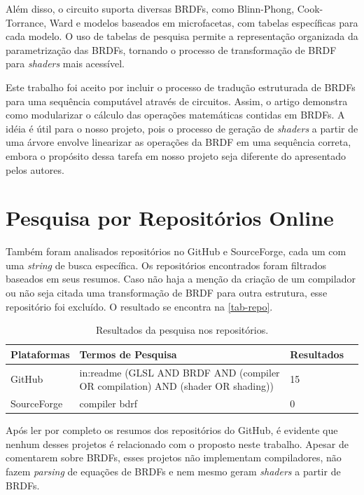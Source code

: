 Além disso, o circuito suporta diversas BRDFs, como Blinn-Phong, Cook-Torrance, Ward e modelos baseados em microfacetas, com tabelas específicas para cada modelo. O uso de tabelas de pesquisa permite a representação organizada da parametrização das BRDFs, tornando o processo de transformação de BRDF para \textit{shaders} mais acessível.

Este trabalho foi aceito por incluir o processo de tradução estruturada de BRDFs para uma sequência computável através de circuitos. Assim, o artigo demonstra como modularizar o cálculo das operações matemáticas contidas em BRDFs. A idéia é útil para o nosso projeto, pois o processo de geração de \textit{shaders} a partir de uma árvore envolve linearizar as operações da BRDF em uma sequência correta, embora o propósito dessa tarefa em nosso projeto seja diferente do apresentado pelos autores.


\section{Pesquisa por Repositórios Online}
Também foram analisados repositórios no GitHub e SourceForge, cada um com uma \textit{string} de busca específica. Os repositórios encontrados foram filtrados baseados em seus resumos. Caso não haja a menção da criação de um compilador ou não seja citada uma transformação de BRDF para outra estrutura, esse repositório foi excluído. O resultado se encontra na \autoref{tab-repo}.






\begin{table}[H]
\ABNTEXfontereduzida
\caption{\small Resultados da pesquisa nos repositórios.}
\label{tab-repo}
\begin{tabular}{p{2.6cm}|p{6.0cm}|p{2.25cm}|p{3.40cm}}
   \textbf{Plataformas} & \textbf{Termos de Pesquisa}  & \textbf{Resultados}\\
   \hline
   GitHub
   &
   in:readme (GLSL AND BRDF AND  (compiler OR compilation) AND (shader OR shading))
   & 15
   \\ \hline
   SourceForge
   &
   compiler bdrf
   & 0
\end{tabular}
\end{table}




Após ler por completo os resumos dos repositórios do GitHub, é evidente que nenhum desses projetos é relacionado com o proposto neste trabalho. Apesar de comentarem sobre BRDFs, esses projetos não implementam compiladores, não fazem \textit{parsing} de equações de BRDFs e nem mesmo geram \textit{shaders} a partir de BRDFs.


